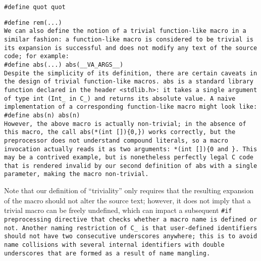 \tt{#define quot quot}

\tt{#define rem(...)}\\

We can also define the notion of a trivial function-like macro in a similar
fashion: a function-like macro is considered to be trivial is its expansion
is successful and does not modify any text of the source code; for example:\\

\tt{#define abs(...) abs(__VA_ARGS__)}\\

Despite the simplicity of its definition,
there are certain caveats in the design of trivial function-like macros.
\tt{abs} is a standard library function declared in the header \tt{<stdlib.h>}:
it takes a single argument of type \tt{int}
(\tt{Int_} in C\_) and returns its absolute value.
A naive implementation of a corresponding function-like macro might look like:\\

\tt{#define abs(n) abs(n)}\\

However, the above macro is actually non-trivial; in
the absence of this macro, the call \tt{abs(*(int [])\{0,\})} works correctly,
but the preprocessor does not understand compound literals,
so a macro invocation actually reads it as two arguments:
\tt{*(int [])\{0} and \tt{\}}.
This may be a contrived example, but is nonetheless perfectly
legal C code that is rendered invalid by our second definition
of \tt{abs} with a single parameter, making the macro non-trivial.

Note that our definition of ``triviality'' only requires that the
resulting expansion of the macro should not alter the source text;
however, it does not imply that a trivial macro can be freely undefined,
which can impact a subsequent \tt{#if} preprocessing
directive that checks whether a macro name is defined or not.
Another naming restriction of C\_ is that user-defined
identifiers should not have two consecutive underscores anywhere;
this is to avoid name collisions with several internal identifiers
with double underscores that are formed as a result of name mangling.



